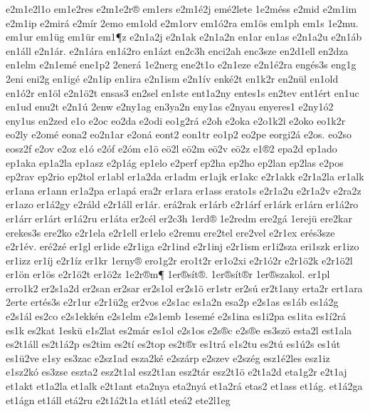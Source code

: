 {e2m1e2l1o
em1e2res
e2m1e2r^^ae
em1ers
e2m1^^e92j
em^^e92lete
1e2m^^e9ss
e2mid
e2m1im
e2m1ip
e2mir^^e1
e2m^^edr
2emo
em1old
e2m1orv
em1^^f32ra
em1^^f6s
em1ph
em1s
1e2mu.
em1ur
em1^^fcg
em1^^fcr
em1^^b6z
e2n1a2j
e2n1ak
e2n1a2n
en1ar
en1as
e2n1a2u
e2n1^^e1b
en1^^e1ll
e2n1^^e1r.
e2n1^^e1ra
en1^^e12ro
en1^^e1zt
en2c3h
enci2ah
enc3sze
en2d1ell
en2dza
en1elm
e2n1em^^e9
ene1p2
2ener^^e1
1e2nerg
ene2t1o
e2n1eze
e2n1^^e92ra
eng^^e9s3s
eng1g
2eni
eni2g
en1ig^^e9
e2n1ip
en1ira
e2n1ism
e2n1^^edv
enk^^e92t
en1k2r
en2n^^fcl
en1old
en1^^f32r
en1^^f6l
e2n1^^f62t
ensas3
en2sel
en1ste
ent1a2ny
entes1s
en2tev
ent1^^e9rt
en1uc
en1ud
enu2t
e2n1^^fa
2enw
e2ny1ag
en3ya2n
eny1as
e2nyau
enyeres1
e2ny1^^f32
eny1us
en2zed
e1o
e2oc
eo2da
e2odi
eo1g2r^^e1
e2oh
e2oka
e2o1k2l
e2oko
eo1k2r
eo2ly
e2om^^e9
eona2
eo2n1ar
e2on^^e1
eont2
eon1tr
eo1p2
eo2pe
eorgi2^^e1
e2os.
eo2so
eosz2f
e2ov
e2oz
e1^^f3
e2^^f3f
e2^^f3m
e1^^f6
e^^f62l
e^^f62m
e^^f62v
e^^f62z
e1^^ae2
epa2d
ep1ado
ep1aka
ep1a2la
ep1asz
e2p1^^e1g
ep1elo
e2perf
ep2ha
ep2ho
ep2lan
ep2las
e2pos
ep2rav
ep2rio
ep2tol
er1abl
er1a2da
er1adm
er1ajk
er1akc
e2r1akk
e2r1a2la
er1alk
er1ana
er1ann
er1a2pa
er1ap^^e1
era2r
er1ara
er1ass
erato1s
e2r1a2u
e2r1a2v
e2ra2z
er1azo
er1^^e12gy
e2r^^e1ld
e2r1^^e1ll
er1^^e1r.
er^^e12rak
er1^^e1rb
e2r1^^e1rf
er1^^e1rk
er1^^e1rn
er1^^e12ro
er1^^e1rr
er1^^e1rt
er1^^e12ru
er1^^e1ta
er2c^^e9l
er2c3h
1erd^^ae
1e2redm
ere2g^^e1
1erej^^fc
ere2kar
erekes3s
ere2ko
e2r1ela
e2r1ell
er1elo
e2remu
ere2tel
ere2vel
e2r1ex
er^^e9s3sze
e2r1^^e9v.
er^^e92z^^e9
er1gl
er1ide
e2r1iga
e2r1ind
e2r1inj
e2r1ism
er1i2sza
eri1szk
er1izo
er1izz
er1^^edj
e2r1^^edz
er1kr
1erny^^ae
ero1g2r
ero1t2r
er1o2xi
e2r1^^f32r
e2r1^^f62k
e2r1^^f62l
er1^^f6n
er1^^f6s
e2r1^^f62t
er1^^f62z
1e2r^^aem^^b6
1er^^aes^^edt^^ae.
1er^^aes^^edt^^aer
1er^^aeszakol.
er1pl
erro1k2
er2s1a2d
er2san
er2sar
er2s1ol
er2s1^^f6
er1str
er2s^^fa
er2t1any
erta2r
ert1ara
2erte
ert^^e9s3s
e2r1ur
e2r1^^fc2g
er2vos
e2s1ac
es1a2n
esa2p
e2s1as
es1^^e1b
es1^^e12g
e2s1^^e1l
es2co
e2s1ekk^^e9n
e2s1elm
e2s1emb
1esem^^e9
e2s1ina
es1i2pa
es1ita
es1^^ed2r^^e1
es1k
es2kat
1esk^^fc
e1s2lat
es2m^^e1r
es1ol
e2s1os
e2s^^aec
e2s^^aee
es3sz^^f6
esta2l
est1ala
es2t1^^e1ll
es2t1^^e12p
es2tim
es2t^^ed
es2top
es2t^^aer
es1tr^^e1
e1s2tu
es2t^^fa
es1^^fa2s
es1^^fat
es1^^fc2ve
e1sy
es3zac
e2sz1ad
esza2k^^e9
e2sz^^e1rp
e2szev
e2sz^^e9g
esz1^^e92les
esz1iz
e1sz2k^^f3
es3zse
eszta2
esz2t1al
esz2t1an
esz2t^^e1r
esz2t1^^f6
e2t1a2d
eta1g2r
e2t1aj
et1akt
et1a2la
et1alk
e2t1ant
eta2nya
eta2ny^^e1
et1a2r^^e1
etas2
et1ass
et1^^e1g.
et1^^e12ga
et1^^e1gn
et1^^e1ll
et^^e12ru
e2t1^^e12t1a
et1^^e1tl
ete^^e12
ete2l1eg
}
